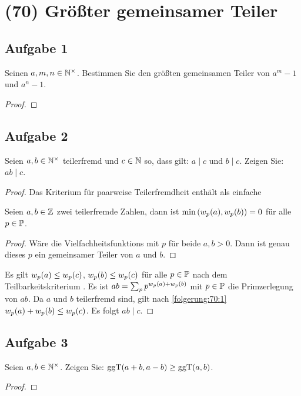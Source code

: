 \section{(70) Größter gemeinsamer Teiler}

\subsection{Aufgabe 1}
Seinen $a,m,n \in \mathbb{N}^\times$. Bestimmen Sie den größten gemeinsamen Teiler
von $a^m - 1$ und $a^n - 1$.
\begin{proof}
\end{proof}

\subsection{Aufgabe 2}
Seien $a,b \in \mathbb{N}^\times$ teilerfremd und $c \in \mathbb{N}$ so,
dass gilt: $a \mid c$ und $b \mid c$. Zeigen Sie: $ab \mid c$.
\begin{proof}
  Das Kriterium für paarweise Teilerfremdheit \parencite[50]{book:zahlentheorie}
  enthält als einfache
  \begin{folgerung}
    \label{folgerung:70:1}
    Seien $a,b \in \mathbb{Z}$ zwei teilerfremde Zahlen, dann ist
    $\min{(w_p(a), w_p(b))} = 0$
    für alle $p \in \mathbb{P}$.
  \end{folgerung}
  \begin{proof}
    Wäre die Vielfachheitsfunktions mit $p$ für beide $a,b > 0$.
    Dann ist genau dieses $p$ ein gemeinsamer Teiler von $a$ und $b$.
  \end{proof}
  \noindent
  Es gilt $w_p(a) \leq w_p(c)$,
  $w_p(b) \leq w_p(c)$ für alle $p \in \mathbb{P}$
  nach dem Teilbarkeitskriterium \parencite[50]{book:zahlentheorie}.
  Es ist $ab = \sum_{p} p^{w_p(a) + w_p(b)}$
  mit $p \in \mathbb{P}$ die Primzerlegung von $ab$.
  Da $a$ und $b$ teilerfremd sind, gilt nach
  \autoref{folgerung:70:1} $w_p(a) + w_p(b)
    \leq w_p(c)$. Es folgt $ab \mid c$.
\end{proof}

\subsection{Aufgabe 3}
Seien $a,b \in \mathbb{N}^\times$. Zeigen Sie: $\text{ggT}(a + b,a - b) \geq \text{ggT}(a,b)$.
\begin{proof}
\end{proof}


